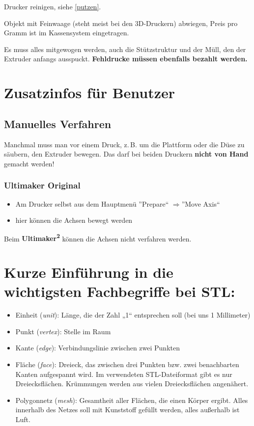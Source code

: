 \documentclass{\basedir/fablab-document}
\newcommand{\fachbegriff}[1]{(\textit{#1})}
\newcommand{\ts}[1]{\textsuperscript{#1}}
\newcommand{\ra}{$\Rightarrow$}
\begin{document}
	Drucker reinigen, siehe \ref{putzen}.
	
	Objekt mit Feinwaage (steht meist bei den 3D-Druckern) abwiegen, Preis pro Gramm ist im Kassensystem eingetragen.
	
	Es muss alles mitgewogen werden, auch die Stützstruktur und der Müll, den der Extruder anfangs ausspuckt. \textbf{Fehldrucke müssen ebenfalls bezahlt werden.}
	\pagebreak
	
	
	\section{Zusatzinfos für Benutzer}
	
	\subsection{Manuelles Verfahren}\label{manuelles-verfahren}
	Manchmal muss man vor einem Druck, z.\,B. um die Plattform oder die Düse zu säubern, den Extruder bewegen.
	Das darf bei beiden Druckern \textbf{nicht von Hand} gemacht werden!
	
	\subsubsection{Ultimaker Original}
	\begin{itemize}
		\item Am Drucker selbst aus dem Hauptmenü ''Prepare`` \ra ''Move Axis``
		\item hier können die Achsen bewegt werden
	\end{itemize}
	Beim \textbf{Ultimaker\ts2} können die Achsen nicht verfahren werden.

	
	
	\section{Kurze Einführung in die wichtigsten Fachbegriffe bei STL:}
	
	\begin{itemize}
		\item Einheit \fachbegriff{unit}: Länge, die der Zahl „1“ entsprechen soll (bei uns
		1 Millimeter)
		\item Punkt \fachbegriff{vertex}: Stelle im Raum
		\item Kante \fachbegriff{edge}: Verbindungslinie zwischen zwei Punkten
		\item Fläche \fachbegriff{face}: Dreieck, das zwischen drei Punkten bzw. zwei
		benachbarten Kanten aufgespannt wird. Im verwendeten STL-Dateiformat
		gibt es nur Dreiecksflächen. Krümmungen werden aus vielen
		Dreiecksflächen angenähert.
		\item Polygonnetz \fachbegriff{mesh}: Gesamtheit aller Flächen, die einen Körper
		ergibt. Alles innerhalb des Netzes soll mit Kunststoff gefüllt werden,
		alles außerhalb ist Luft.
	\end{itemize}
	
\end{document}
